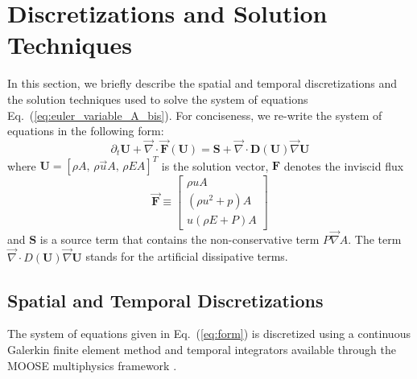\documentclass[preprint,10pt]{elsarticle}
\renewcommand{\div}{\vec{\nabla}\! \cdot \!}
\newcommand{\grad}{\vec{\nabla}}
\newcommand{\eqt}[1]{Eq.~(\ref{#1})}                     %
\begin{document}
\section{Discretizations and Solution Techniques} \label{sec:solution_tech}

In this section, we briefly describe the spatial and temporal discretizations and the solution techniques 
used to solve the system of equations \eqt{eq:euler_variable_A_bis}. For conciseness, we re-write the system of 
equations in the following form:
\begin{equation}
\label{eq:form}
\partial_t \mathbf{U} + \div \vec{\mathbf{F}}\left( \mathbf{U} \right) = \mathbf{S} + \div \mathbf{D}(\mathbf{U}) \grad \mathbf{U}
\end{equation}
where $\mathbf{U}=[\rho A,\, \rho \vec{u} A,\, \rho E A]^T$ is the solution vector, $\mathbf{F}$ denotes the inviscid flux 
\begin{equation}
  \vec{\mathbf{F}} \equiv
  \begin{bmatrix}
    \rho u A                     \\
    \left(\rho u^2 + p\right) A  \\
    u (\rho E +P) A
  \end{bmatrix}
\end{equation}
and $\mathbf{S}$ is a source term that contains the non-conservative term $P\grad A$. The term 
$\div D(\mathbf{U}) \grad \mathbf{U}$ stands for the artificial dissipative terms. 

\subsection{Spatial and Temporal Discretizations} \label{sec:disc}
The system of equations given in \eqt{eq:form} is discretized using a continuous Galerkin finite element 
method and temporal integrators available through the MOOSE multiphysics framework \cite{MOOSE}.
\end{document}
